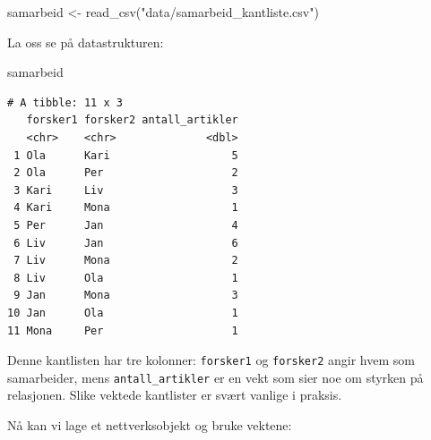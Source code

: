 \documentclass[
  norsk,
  letterpaper,
  DIV=11,
  numbers=noendperiod]{scrreprt}
\newenvironment{Shaded}{\begin{snugshade}}{\end{snugshade}}
\newcommand{\FunctionTok}[1]{\textcolor[rgb]{0.28,0.35,0.67}{#1}}
\newcommand{\NormalTok}[1]{\textcolor[rgb]{0.00,0.23,0.31}{#1}}
\newcommand{\OtherTok}[1]{\textcolor[rgb]{0.00,0.23,0.31}{#1}}
\newcommand{\StringTok}[1]{\textcolor[rgb]{0.13,0.47,0.30}{#1}}
\theoremstyle{definition}
\theoremstyle{remark}
\begin{document}
\begin{Shaded}
\begin{Highlighting}[]
\NormalTok{samarbeid }\OtherTok{\textless{}{-}} \FunctionTok{read\_csv}\NormalTok{(}\StringTok{"data/samarbeid\_kantliste.csv"}\NormalTok{)}
\end{Highlighting}
\end{Shaded}

La oss se på datastrukturen:

\begin{Shaded}
\begin{Highlighting}[]
\NormalTok{samarbeid}
\end{Highlighting}
\end{Shaded}

\begin{verbatim}
# A tibble: 11 x 3
   forsker1 forsker2 antall_artikler
   <chr>    <chr>              <dbl>
 1 Ola      Kari                   5
 2 Ola      Per                    2
 3 Kari     Liv                    3
 4 Kari     Mona                   1
 5 Per      Jan                    4
 6 Liv      Jan                    6
 7 Liv      Mona                   2
 8 Liv      Ola                    1
 9 Jan      Mona                   3
10 Jan      Ola                    1
11 Mona     Per                    1
\end{verbatim}

Denne kantlisten har tre kolonner: \texttt{forsker1} og
\texttt{forsker2} angir hvem som samarbeider, mens
\texttt{antall\_artikler} er en vekt som sier noe om styrken på
relasjonen. Slike vektede kantlister er svært vanlige i praksis.

Nå kan vi lage et nettverksobjekt og bruke vektene:
\end{document}

